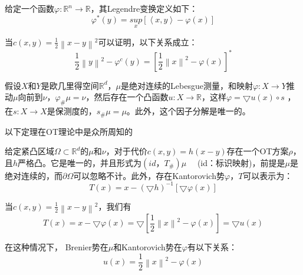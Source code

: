 \begin{definition}[Legendre变换]	\label{definition:3.4}
	给定一个函数$\varphi : \mathbb{R}^n \to \mathbb{R}$，其Legendre变换定义如下：
	\begin{equation}
		\varphi ^*(y)=\underset{x}{sup}\left [ \left \langle x,y \right \rangle -\varphi (x) \right ]  
		\label{function:14}
	\end{equation}

	当$c(x,y)=\frac{1}{2} \left \| x-y \right \| ^2 $可以证明，以下关系成立：
	\begin{equation}
		\frac{1}{2}\left \| y \right \|^2-\varphi ^c (y)=\left [ \frac{1}{2} \left \| x \right \| ^2-\varphi (x) \right ]^*  
		\label{function:15}
	\end{equation}
\end{definition}

\begin{theorem}[Briener极性因子分解【44】]	\label{theorem:3.2}
	假设$X$和$Y$是欧几里得空间$\mathbb{R}^d$，$\mu$是绝对连续的Lebesgue测量，和映射$\varphi : X\to Y$推动$\mu$向前到$\nu$，$\varphi _{\#}\mu=\nu$，然后存在一个凸函数$u: X \to \mathbb{R}$，这样$\varphi=\bigtriangledown u(x)\circ s $ ，在$s: X \to X$是保测度的，$s_{\#}\mu=\mu$。此外，这个因子分解是唯一的。
\end{theorem}

以下定理在OT理论中是众所周知的
\begin{theorem}[Villani【44】]	\label{theorem:3.3}
	给定紧凸区域$\Omega \subset \mathbb{R}^d$的$\mu$和$\nu$，对于代价$c(x,y)=h(x-y)$存在一个OT方案$\rho$，且$h$严格凸。它是唯一的，并且形式为$(id，T_{\#})\mu \quad$ (id：标识映射)，前提是$\mu$是绝对连续的，而$\partial \Omega$可以忽略不计。此外，存在Kantorovich势$\varphi$，$T$可以表示为：
	\begin{equation*}
		T(x)=x-(\bigtriangledown h)^{-1} \left [ \bigtriangledown \varphi (x) \right ] 
	\end{equation*}

	当$c(x,y)=\frac{1}{2} \left \| x-y \right \|^2 $，我们有
	\begin{equation*}
		T(x)=x- \bigtriangledown \varphi (x)= \bigtriangledown \left [ \frac{1}{2} \left \| x \right \| ^2 - \varphi(x) \right ] =  \bigtriangledown u(x)
	\end{equation*}

	在这种情况下， Brenier势在$\mu$和Kantorovich势在$\varphi$有以下关系：
	\begin{equation}
		u(x)=\frac{1}{2} \left \| x \right \| ^2 -\varphi (x)
		\label{function:16}
	\end{equation}
\end{theorem}

